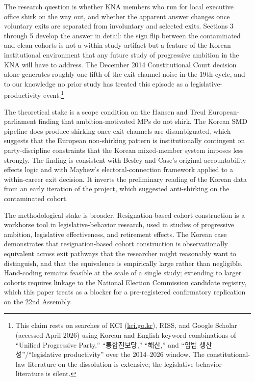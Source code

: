 \documentclass[11pt]{article}
\begin{document}
The research question is whether KNA members who run for local executive office shirk on the way out, and whether the apparent answer changes once voluntary exits are separated from involuntary and selected exits. Sections 3 through 5 develop the answer in detail: the sign flip between the contaminated and clean cohorts is not a within-study artifact but a feature of the Korean institutional environment that any future study of progressive ambition in the KNA will have to address. The December 2014 Constitutional Court decision alone generates roughly one-fifth of the exit-channel noise in the 19th cycle, and to our knowledge no prior study has treated this episode as a legislative-productivity event.\footnote{This claim rests on searches of KCI (\url{kci.go.kr}), RISS, and Google Scholar (accessed April 2026) using Korean and English keyword combinations of ``Unified Progressive Party,'' ``통합진보당,'' ``해산,'' and ``입법 생산성''/``legislative productivity'' over the 2014--2026 window. The constitutional-law literature on the dissolution is extensive; the legislative-behavior literature is silent.}

The theoretical stake is a scope condition on the Hansen and Treul \citeyearpar{hansen2015} European-parliament finding that ambition-motivated MPs do not shirk. The Korean SMD pipeline does produce shirking once exit channels are disambiguated, which suggests that the European non-shirking pattern is institutionally contingent on party-discipline constraints that the Korean mixed-member system imposes less strongly. The finding is consistent with Besley and Case's \citeyearpar{besley1995} original accountability-effects logic and with Mayhew's \citeyearpar{mayhew1974} electoral-connection framework applied to a within-career exit decision. It inverts the preliminary reading of the Korean data from an early iteration of the project, which suggested anti-shirking on the contaminated cohort.

The methodological stake is broader. Resignation-based cohort construction is a workhorse tool in legislative-behavior research, used in studies of progressive ambition, legislative effectiveness, and retirement effects. The Korean case demonstrates that resignation-based cohort construction is observationally equivalent across exit pathways that the researcher might reasonably want to distinguish, and that the equivalence is empirically large rather than negligible. Hand-coding remains feasible at the scale of a single study; extending to larger cohorts requires linkage to the National Election Commission candidate registry, which this paper treats as a blocker for a pre-registered confirmatory replication on the 22nd Assembly.
\end{document}
